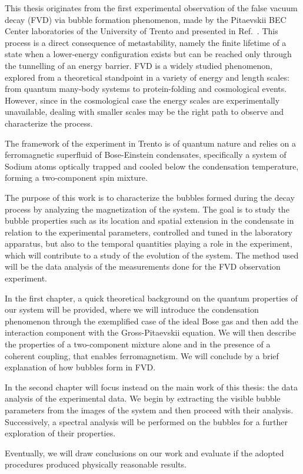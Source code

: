 This thesis originates from the first experimental observation of the false vacuum decay (FVD) via bubble formation phenomenon, made by the Pitaevskii BEC Center laboratories of the University of Trento and presented in Ref.\ \cite{zenesini2024false}. This process is a direct consequence of metastability, namely the finite lifetime of a state when a lower-energy configuration exists but can be reached only through the tunnelling of an energy barrier. FVD is a widely studied phenomenon, explored from a theoretical standpoint in a variety of energy and length scales: from quantum many-body systems to protein-folding and cosmological events. However, since in the cosmological case the energy scales are experimentally unavailable, dealing with smaller scales may be the right path to observe and characterize the process.

The framework of the experiment in Trento is of quantum nature and relies on a ferromagnetic superfluid of Bose-Einstein condensates, specifically a system of Sodium atoms optically trapped and cooled below the condensation temperature, forming a two-component spin mixture.

The purpose of this work is to characterize the bubbles formed during the decay process by analyzing the magnetization of the system. The goal is to study the bubble properties such as its location and spatial extension in the condensate in relation to the experimental parameters, controlled and tuned in the laboratory apparatus, but also to the temporal quantities playing a role in the experiment, which will contribute to a study of the evolution of the system. The method used will be the data analysis of the measurements done for the FVD observation experiment.

In the first chapter, a quick theoretical background on the quantum properties of our system will be provided, where we will introduce the condensation phenomenon through the exemplified case of the ideal Bose gas and then add the interaction component with the Gross-Pitaevskii equation. We will then describe the properties of a two-component mixture alone and in the presence of a coherent coupling, that enables ferromagnetism. We will conclude by a brief explanation of how bubbles form in FVD.

In the second chapter will focus instead on the main work of this thesis: the data analysis of the experimental data. We begin by extracting the visible bubble parameters from the images of the system and then proceed with their analysis. Successively, a spectral analysis will be performed on the bubbles for a further exploration of their properties.

Eventually, we will draw conclusions on our work and evaluate if the adopted procedures produced physically reasonable results.
